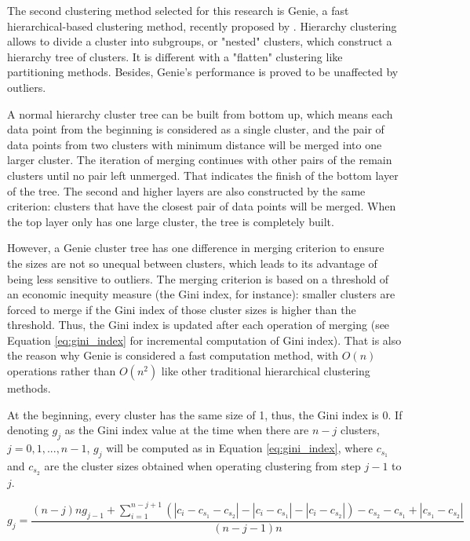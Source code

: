 \documentclass[a4paper,man,floatsintext,natbib,noextraspace]{apa6}
\begin{document}
The second clustering method selected for this research is Genie, a fast hierarchical-based clustering method, recently proposed by \cite{gagolewskiGenieNewFast2016a}. Hierarchy clustering allows to divide a cluster into subgroups, or "nested" clusters, which construct a hierarchy tree of clusters. It is different with a "flatten" clustering like partitioning methods. Besides, Genie’s performance is proved to be unaffected by outliers.

A normal hierarchy cluster tree can be built from bottom up, which means each data point from the beginning is considered as a single cluster, and the pair of data points from two clusters with minimum distance will be merged into one larger cluster. The iteration of merging continues with other pairs of the remain clusters until no pair left unmerged. That indicates the finish of the bottom layer of the tree. The second and higher layers are also constructed by the same criterion: clusters that have the closest pair of data points will be merged. When the top layer only has one large cluster, the tree is completely built. 

However, a Genie cluster tree has one difference in merging criterion to ensure the sizes are not so unequal between clusters, which leads to its advantage of being less sensitive to outliers. The merging criterion is based on a threshold of an economic inequity measure (the Gini index, for instance): smaller clusters are forced to merge if the Gini index of those cluster sizes is higher than the threshold. Thus, the Gini index is updated after each operation of merging (see Equation \eqref{eq:gini_index} for incremental computation of Gini index). That is also the reason why Genie is considered a fast computation method, with $O(n)$ operations rather than $O(n^{2})$ like other traditional hierarchical clustering methods.

At the beginning, every cluster has the same size of 1, thus, the Gini index is 0. If denoting $g_{j}$ as the Gini index value at the time when there are $n − j$ clusters, $j = 0, 1, ..., n − 1$, $g_{j}$ will be computed as in Equation \eqref{eq:gini_index}, where $c_{s_{1}}$ and $c_{s_{2}}$ are the cluster sizes obtained when operating clustering from step $j-1$ to $j$.

\begin{equation}\label{eq:gini_index}
    g_{j} = \dfrac{(n-j)ng_{j-1} + \sum_{i=1}^{n-j+1} (|c_{i} - c_{s_{1}} - c_{s_{2}}| - |c_{i} - c_{s_{1}}| - |c_{i} - c_{s_{2}}|) - c_{s_{2}} - c_{s_{1}} + |c_{s_{1}} - c_{s_{2}}|}{(n-j-1)n}
\end{equation}
\end{document}
